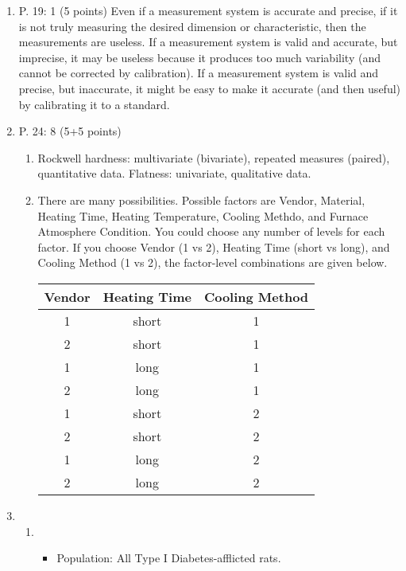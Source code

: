 \documentclass{article}
\begin{document}
\begin{enumerate}
{		(Or one can just say there is no treatment variable in an
		observatinal study.)
		}
	\item P. 19: 1 (5 points)
		{\color{red} Even if a measurement system is accurate and precise, if it is
		not truly measuring the desired dimension or characteristic,
		then the measurements are useless. If a measurement system is
		valid and accurate, but imprecise, it may be useless because
		it produces too much variability (and cannot be corrected by
		calibration). If a measurement system is valid and precise, but
		inaccurate, it might be easy to make it accurate (and then
	useful) by calibrating it to a standard.}
	\item P. 24: 8 (5+5 points)
		{\color{red}
		\begin{enumerate}
			\item Rockwell hardness: multivariate (bivariate),
				repeated measures (paired), quantitative
				data. Flatness: univariate, qualitative data.
			\item There are many possibilities. Possible factors
				are Vendor, Material, Heating Time, Heating
				Temperature, Cooling Methdo, and Furnace
				Atmosphere Condition. You could choose any
				number of levels for each factor. If you
				choose Vendor (1 vs 2), Heating Time (short vs
				long), and Cooling Method (1 vs 2), the
				factor-level combinations are given below.

				\begin{center}
					\begin{tabular}{ccc}
					Vendor & Heating Time & Cooling Method\\
					\hline
					1 & short & 1\\
					2 & short & 1\\
					1 & long & 1\\
					2 & long & 1\\
					1 & short & 2\\
					2& short & 2\\
					1& long & 2\\
					2 & long & 2
					\end{tabular}
				\end{center}
		\end{enumerate}
		}
\item
\begin{enumerate}
	\item
		{\color{red} \begin{itemize}
\item Population: All Type I Diabetes-afflicted rats. 


\end{itemize}}
\end{enumerate}
\end{enumerate}
\end{document}
